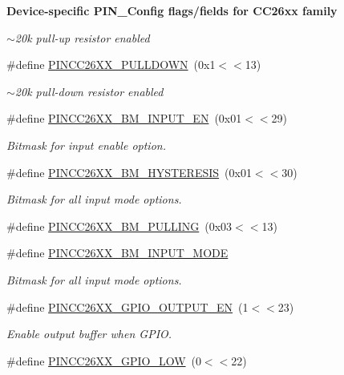 \begin{Indent}{\bf Device-\/specific P\-I\-N\-\_\-\-Config flags/fields for C\-C26xx family}
\begin{DoxyCompactItemize}
\begin{DoxyCompactList}\small\item\em $\sim$20k pull-\/up resistor enabled \end{DoxyCompactList}\item 
\#define \hyperlink{_p_i_n_c_c26_x_x_8h_a3fac53dff43a2718044afdcdfa916d53}{P\-I\-N\-C\-C26\-X\-X\-\_\-\-P\-U\-L\-L\-D\-O\-W\-N}~(0x1$<$$<$13)
\begin{DoxyCompactList}\small\item\em $\sim$20k pull-\/down resistor enabled \end{DoxyCompactList}\item 
\#define \hyperlink{_p_i_n_c_c26_x_x_8h_a2597baf0e1d85b01a0c953399b3ac8d8}{P\-I\-N\-C\-C26\-X\-X\-\_\-\-B\-M\-\_\-\-I\-N\-P\-U\-T\-\_\-\-E\-N}~(0x01$<$$<$29)
\begin{DoxyCompactList}\small\item\em Bitmask for input enable option. \end{DoxyCompactList}\item 
\#define \hyperlink{_p_i_n_c_c26_x_x_8h_a58d1d38ce029a08e7b7daefa5a37b36d}{P\-I\-N\-C\-C26\-X\-X\-\_\-\-B\-M\-\_\-\-H\-Y\-S\-T\-E\-R\-E\-S\-I\-S}~(0x01$<$$<$30)
\begin{DoxyCompactList}\small\item\em Bitmask for all input mode options. \end{DoxyCompactList}\item 
\#define \hyperlink{_p_i_n_c_c26_x_x_8h_af544027abbe329d9bfab802d28db85b6}{P\-I\-N\-C\-C26\-X\-X\-\_\-\-B\-M\-\_\-\-P\-U\-L\-L\-I\-N\-G}~(0x03$<$$<$13)
\item 
\#define \hyperlink{_p_i_n_c_c26_x_x_8h_a4d6f0a3f1a8dcede9f92055d6d581d5f}{P\-I\-N\-C\-C26\-X\-X\-\_\-\-B\-M\-\_\-\-I\-N\-P\-U\-T\-\_\-\-M\-O\-D\-E}
\begin{DoxyCompactList}\small\item\em Bitmask for all input mode options. \end{DoxyCompactList}\item 
\#define \hyperlink{_p_i_n_c_c26_x_x_8h_aef729e00581046126a8ddfaaffd89c12}{P\-I\-N\-C\-C26\-X\-X\-\_\-\-G\-P\-I\-O\-\_\-\-O\-U\-T\-P\-U\-T\-\_\-\-E\-N}~(1$<$$<$23)
\begin{DoxyCompactList}\small\item\em Enable output buffer when G\-P\-I\-O. \end{DoxyCompactList}\item 
\#define \hyperlink{_p_i_n_c_c26_x_x_8h_a8c77c9ca4b7ea3c71ad06dd0a969533f}{P\-I\-N\-C\-C26\-X\-X\-\_\-\-G\-P\-I\-O\-\_\-\-L\-O\-W}~(0$<$$<$22)

\end{DoxyCompactItemize}
\end{Indent}

